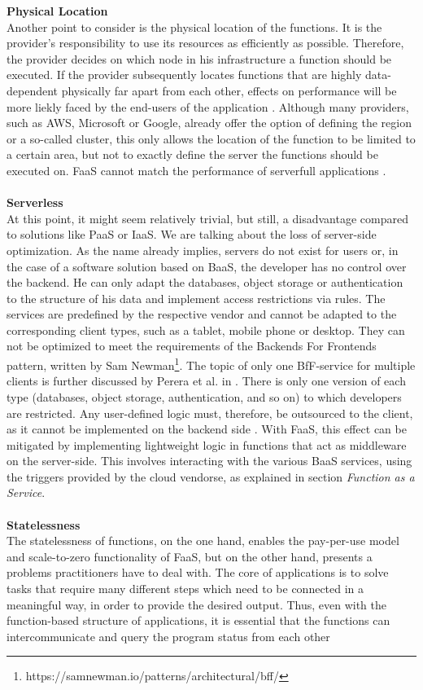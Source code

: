 \documentclass[a4paper,twoside,11pt, pagesize]{scrartcl}
\begin{document}
\begin{spacing}{1.2}
\textbf{Physical Location}\\ Another point to consider is the physical location of the functions. It is the provider's responsibility to use its resources as efficiently as possible. Therefore, the provider decides on which node in his infrastructure a function should be executed. If the provider subsequently locates functions that are highly data-dependent physically far apart from each other, effects on performance will be more liekly faced by the end-users of the application \cite{shafiei2020serverless}. Although many providers, such as AWS, Microsoft or Google, already offer the option of defining the region or a so-called cluster, this only allows the location of the function to be limited to a certain area, but not to exactly define the server the functions should be executed on. FaaS cannot match the performance of serverfull applications \cite{shafiei2020serverless}.\\\\ \textbf{Serverless}\\ At this point, it might seem relatively trivial, but still, a disadvantage compared to solutions like PaaS or IaaS. We are talking about the loss of server-side optimization. As the name already implies, servers do not exist for users or, in the case of a software solution based on BaaS, the developer has no control over the backend. He can only adapt the databases, object storage or authentication to the structure of his data and implement access restrictions via rules. The services are predefined by the respective vendor and cannot be adapted to the corresponding client types, such as a tablet, mobile phone or desktop. They can not be optimized to meet the requirements of the \glqq Backends For Frontends\grqq{} pattern, written by Sam Newman\footnote{https://samnewman.io/patterns/architectural/bff/}. The topic of only one BfF-service for multiple clients is further discussed by Perera et al. in \cite{perera2018rule}. There is only one version of each type (databases, object storage, authentication, and so on) to which developers are restricted. Any user-defined logic must, therefore, be outsourced to the client, as it cannot be implemented on the backend side \cite{fowler2018serverless}. With FaaS, this effect can be mitigated by implementing lightweight logic in functions that act as middleware on the server-side. This involves interacting with the various BaaS services, using the triggers provided by the cloud vendorse, as explained in section \textit{Function as a Service}.\\\\ \textbf{Statelessness}\\ The statelessness of functions, on the one hand, enables the pay-per-use model and scale-to-zero functionality of FaaS, but on the other hand, presents a problems practitioners have to deal with. The core of applications is to solve tasks that require many different steps which need to be connected in a meaningful way, in order to provide the desired output. Thus, even with the function-based structure of applications, it is essential that the functions can intercommunicate and query the program status from each other 
\end{spacing}
\end{document}
